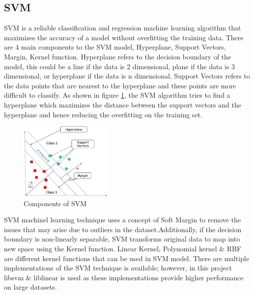 \documentclass[twoside,11pt,a4paper]{article}
\begin{document}
\subsection{\acf{SVM}}
\acs{SVM} is a reliable classification and regression machine learning algorithm that maximizes the accuracy of a model without overfitting the training data. There are 4 main components to the \acs{SVM} model, Hyperplane, Support Vectors, Margin, Kernel function. Hyperplane refers to the decision boundary of the model, this could be a line if the data is 2 dimensional, plane if the data is 3 dimensional, or hyperplane if the data is n dimensional. Support Vectors refers to the data points that are nearest to the hyperplane and  these points are more difficult to classify. As shown in figure \ref{fig:svm}, the \acs{SVM} algorithm tries to find a hyperplane which maximizes the distance between the support vectors and the hyperplane and hence reducing the overfitting on the training set.\\
\begin{figure}[ht]
	\centering
	\includegraphics[width=0.4\textwidth]{svm}
	\caption[Support Vector Machine]{Components of \acs{SVM} \citep{rani2022machine}}
	\label{fig:svm}
\end{figure}
\FloatBarrier
\acs{SVM} machinel learning technique uses a concept of Soft Margin to remove the issues that may arise due to outliers in the dataset.Additionally, if the decision boundary is non-linearly separable, \acs{SVM} transforms original data to map into new space using the Kernel function. Linear Kernel, Polynomial kernel \& \acf{RBF} are different kernel functions that can be used in \acs{SVM} model. There are multiple implementations of the \acs{SVM} technique is available; however, in this project libsvm\citep{chang2011libsvm} \& liblinear \citep{fan2008liblinear} is used as these implementations provide higher performance on large datasets.
\end{document}
